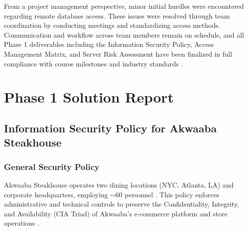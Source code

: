 \documentclass[10pt,a4paper]{article}
\begin{document}
From a project management perspective, minor initial hurdles were encountered regarding remote database access. These issues were resolved through team coordination by conducting meetings and standardizing access methods. Communication and workflow across team members remain on schedule, and all Phase 1 deliverables including the Information Security Policy, Access Management Matrix, and Server Risk Assessment have been finalized in full compliance with course milestones and industry standards \cite{Phase1Guide, LiISP, RiskGuide}.

\section{Phase 1 Solution Report}

\subsection{Information Security Policy for Akwaaba Steakhouse}

\subsubsection{General Security Policy}
Akwaaba Steakhouse operates two dining locations (NYC, Atlanta, LA) and corporate headquarters, employing $\sim$60 personnel \cite{AkwaabaConfig}. This policy enforces administrative and technical controls to preserve the Confidentiality, Integrity, and Availability (CIA Triad) of Akwaaba's e-commerce platform and store operations \cite{AkwaabaConfig, LiISP}.
\end{document}
